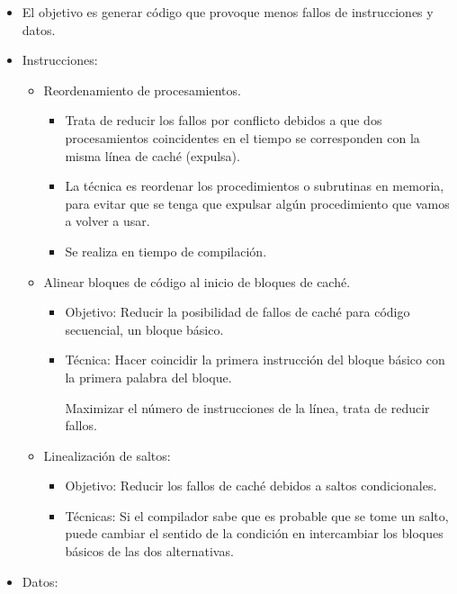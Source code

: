 \documentclass[12pt, twoside, openright]{report} %
\begin{document}
\begin{itemize}

	\item El objetivo es generar código que provoque menos fallos de
	      instrucciones y datos.
	\item Instrucciones:

	      \begin{itemize}

		      \item Reordenamiento de procesamientos.

		            \begin{itemize}

			            \item Trata de reducir los fallos por conflicto debidos a que dos
			                  procesamientos coincidentes en el tiempo se corresponden con
			                  la misma línea de caché (expulsa).
			            \item La técnica es reordenar los procedimientos o subrutinas en
			                  memoria, para evitar que se tenga que expulsar algún
			                  procedimiento que vamos a volver a usar.
			            \item Se realiza en tiempo de compilación.
		            \end{itemize}
		      \item Alinear bloques de código al inicio de bloques de caché.

		            \begin{itemize}

			            \item Objetivo: Reducir la posibilidad de fallos de caché para
			                  código secuencial, un bloque básico.
			            \item Técnica: Hacer coincidir la primera instrucción del bloque
			                  básico con la primera palabra del bloque.



			                  Maximizar el número de instrucciones de la línea, trata de
			                  reducir fallos.

		            \end{itemize}
		      \item Linealización de saltos:

		            \begin{itemize}

			            \item Objetivo: Reducir los fallos de caché debidos a saltos
			                  condicionales.
			            \item Técnicas: Si el compilador sabe que es probable que se tome un
			                  salto, puede cambiar el sentido de la condición en
			                  intercambiar los bloques básicos de las dos alternativas.
		            \end{itemize}
	      \end{itemize}
	\item Datos:


\end{itemize}
\end{document}
